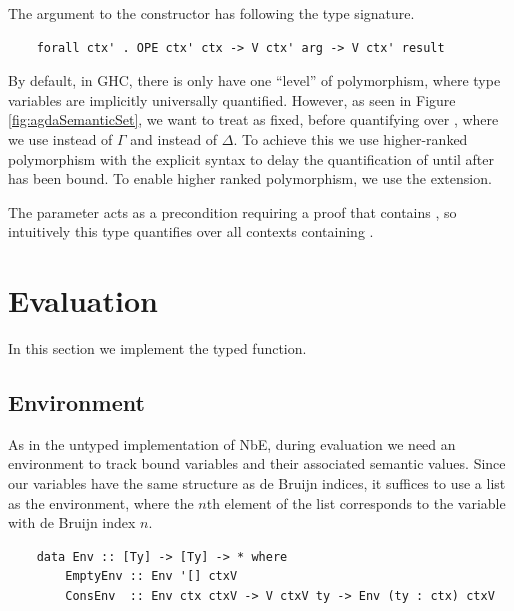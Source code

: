 
The argument to the  constructor has following the type signature.
\begin{lstlisting}
    forall ctx' . OPE ctx' ctx -> V ctx' arg -> V ctx' result 
\end{lstlisting}

By default, in GHC, there is only have one “level” of polymorphism, where type variables are implicitly universally quantified. However, as seen in Figure \ref{fig:agdaSemanticSet}, we want to treat  as fixed, before quantifying over , where we use  instead of $\Gamma$ and  instead of $\Delta$.
To achieve this we use higher-ranked polymorphism with the explicit  syntax to delay the quantification of  until after  has been bound. To enable higher ranked polymorphism, we use the  extension. 

The  parameter acts as a precondition requiring a proof that  contains , so intuitively this type quantifies over all contexts containing .


\section{Evaluation}

In this section we implement the typed  function.

\subsection{Environment}


As in the untyped implementation of NbE, during evaluation we need an environment to track bound variables and their associated semantic values. Since our variables have the same structure as de Bruijn indices, it suffices to use a list as the environment, where the $n$th element of the list corresponds to the variable with de Bruijn index $n$.


\begin{lstlisting}
    data Env :: [Ty] -> [Ty] -> * where
        EmptyEnv :: Env '[] ctxV
        ConsEnv  :: Env ctx ctxV -> V ctxV ty -> Env (ty : ctx) ctxV
\end{lstlisting}

